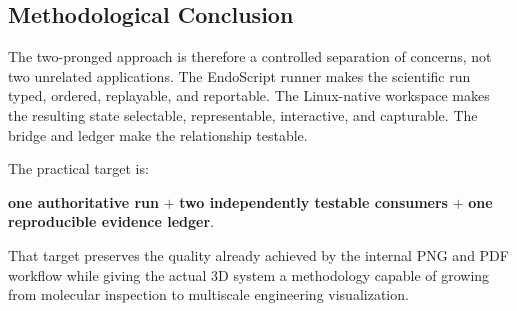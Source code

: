 \documentclass[11pt,a4paper]{article}
\begin{document}
\subsection{Methodological Conclusion}

The two-pronged approach is therefore a controlled separation of concerns,
not two unrelated applications.  The EndoScript runner makes the scientific
run typed, ordered, replayable, and reportable.  The Linux-native workspace
makes the resulting state selectable, representable, interactive, and
capturable.  The bridge and ledger make the relationship testable.

The practical target is:

\begin{center}
\large
\textbf{one authoritative run} $+$
\textbf{two independently testable consumers} $+$
\textbf{one reproducible evidence ledger}.
\end{center}

That target preserves the quality already achieved by the internal PNG and
PDF workflow while giving the actual 3D system a methodology capable of
growing from molecular inspection to multiscale engineering visualization.
\end{document}
